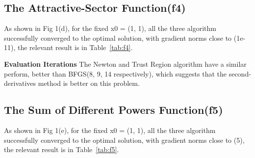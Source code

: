 \documentclass[12pt]{article}
\begin{document}
\subsection{The Attractive-Sector Function(f4)}
As shown in  Fig 1(d), for the fixed x0 = (1, 1), all the three algorithm  successfully converged to the optimal solution, with gradient norms close to (1e-11), the relevant result is in Table~\ref{tab:f4}.

\textbf{Evaluation Iterations}  
The Newton and Trust Region algorithm have a similar perform, better than BFGS(8, 9, 14 respectively), which suggests that the second-derivatives method is better on this problem.

\begin{table}[h]
    \centering
    \caption{Optimization results for the Attractive-Sector Function.}
    \label{tab:f4}
\end{table}

\subsection{The Sum of Different Powers Function(f5)}
As shown in  Fig 1(e), for the fixed x0 = (1, 1), all the three algorithm  successfully converged to the optimal solution, with gradient norms close to (5), the relevant result is in Table~\ref{tab:f5}.
\end{document}
